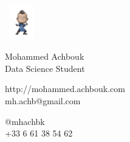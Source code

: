 \documentclass{article}
\begin{document}
\centering \includegraphics[width=1.5cm, height=1.5cm]{logo}\\[5pt]
\parbox{2in}{\Large \centering Mohammed Achbouk\\[1pt]
\normalsize Data Science Student}

\vfill
\raggedright
\begin{multicols}{2}
http://mohammed.achbouk.com\\
mh.achb@gmail.com

\columnbreak
\raggedleft
@mhachbk\\
+33 6 61 38 54 62%
\end{multicols}%
\end{document}
